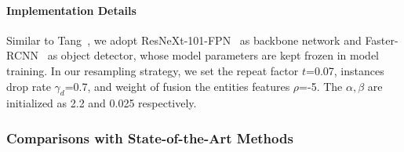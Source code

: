\paragraph{Implementation Details}
Similar to Tang~\cite{tang_unbiased_2020}, we adopt ResNeXt-101-FPN~\cite{xie2017aggregated} as backbone network and Faster-RCNN~\cite{ren_faster_2015} as object detector, 
whose model parameters are kept frozen in model training.
In our resampling strategy, we set the repeat factor $t$=0.07, instances drop rate $\gamma_d$=0.7, and weight of fusion the entities features $\rho$=-5.
The $\alpha, \beta$ are initialized as 2.2 and 0.025 respectively.



\subsubsection{Comparisons with State-of-the-Art Methods} \label{subsec:sota_comp}


